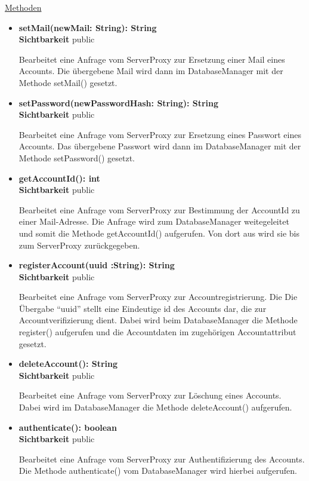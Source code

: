 \underline{Methoden}
\begin{itemize}
\itemsep0pt
\item \textbf{setMail(newMail: String): String}\hfill\\
\textbf{Sichtbarkeit} public

Bearbeitet eine Anfrage vom ServerProxy zur Ersetzung einer Mail eines Accounts. Die übergebene Mail wird dann im DatabaseManager mit der Methode setMail() gesetzt.

\item \textbf{setPassword(newPasswordHash: String): String}\hfill\\
\textbf{Sichtbarkeit} public

Bearbeitet eine Anfrage vom ServerProxy zur Ersetzung eines Passwort eines Accounts. Das übergebene Passwort wird dann im DatabaseManager mit der Methode setPassword() gesetzt.

\item \textbf{getAccountId(): int}\hfill\\
\textbf{Sichtbarkeit} public

Bearbeitet eine Anfrage vom ServerProxy zur Bestimmung der AccountId zu einer Mail-Adresse. Die Anfrage wird zum DatabaseManager weitegeleitet und somit die Methode getAccountId() aufgerufen. Von dort aus wird sie bis zum ServerProxy zurückgegeben.  

\item \textbf{registerAccount(uuid :String): String}\hfill\\
\textbf{Sichtbarkeit} public

Bearbeitet eine Anfrage vom ServerProxy zur Accountregistrierung. Die Die Übergabe ``uuid'' stellt eine Eindeutige id des Accounts dar, die zur Accountverifizierung dient. Dabei wird beim DatabaseManager die Methode register() aufgerufen und die Accountdaten im zugehörigen Accountattribut gesetzt. 

\item \textbf{deleteAccount(): String}\hfill\\
\textbf{Sichtbarkeit} public

Bearbeitet eine Anfrage vom ServerProxy zur Löschung eines Accounts. Dabei wird im DatabaseManager die Methode deleteAccount() aufgerufen.

\item \textbf{authenticate(): boolean}\hfill\\
\textbf{Sichtbarkeit} public

Bearbeitet eine Anfrage vom ServerProxy zur Authentifizierung des Accounts. Die Methode authenticate() vom DatabaseManager wird hierbei aufgerufen.
 

\end{itemize}
